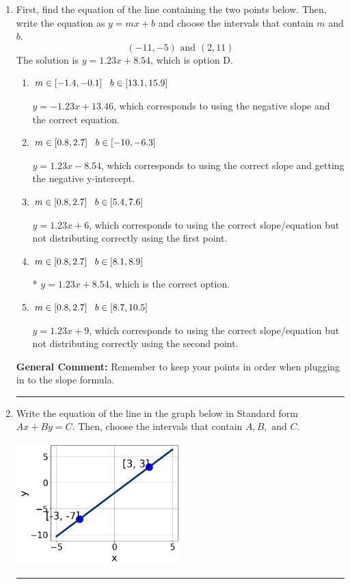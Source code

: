 \documentclass{extbook}[14pt]
\newcommand{\litem}[1]{\item #1

\rule{\textwidth}{0.4pt}}
\begin{document}
\begin{enumerate}\litem{
First, find the equation of the line containing the two points below. Then, write the equation as $ y=mx+b $ and choose the intervals that contain $m$ and $b$.
\[ (-11, -5) \text{ and } (2, 11) \]The solution is \( y = 1.23x + 8.54 \), which is option D.\begin{enumerate}[label=\Alph*.]
\item \( m \in [-1.4, -0.1] \hspace*{3mm} b \in [13.1, 15.9] \)

 $y = -1.23x + 13.46$, which corresponds to using the negative slope and the correct equation.
\item \( m \in [0.8, 2.7] \hspace*{3mm} b \in [-10, -6.3] \)

 $y = 1.23x -8.54$, which corresponds to using the correct slope and getting the negative y-intercept.
\item \( m \in [0.8, 2.7] \hspace*{3mm} b \in [5.4, 7.6] \)

 $y = 1.23x + 6$, which corresponds to using the correct slope/equation but not distributing correctly using the first point.
\item \( m \in [0.8, 2.7] \hspace*{3mm} b \in [8.1, 8.9] \)

* $y = 1.23x + 8.54$, which is the correct option.
\item \( m \in [0.8, 2.7] \hspace*{3mm} b \in [8.7, 10.5] \)

 $y = 1.23x + 9$, which corresponds to using the correct slope/equation but not distributing correctly using the second point.
\end{enumerate}

\textbf{General Comment:} Remember to keep your points in order when plugging in to the slope formula.
}
\litem{
Write the equation of the line in the graph below in Standard form $Ax+By=C$. Then, choose the intervals that contain $A, B, \text{ and } C$.

\begin{center}
    \includegraphics[width=0.5\textwidth]{../Figures/linearGraphToStandardB.png}
\end{center}


}
\end{enumerate}
\end{document}
